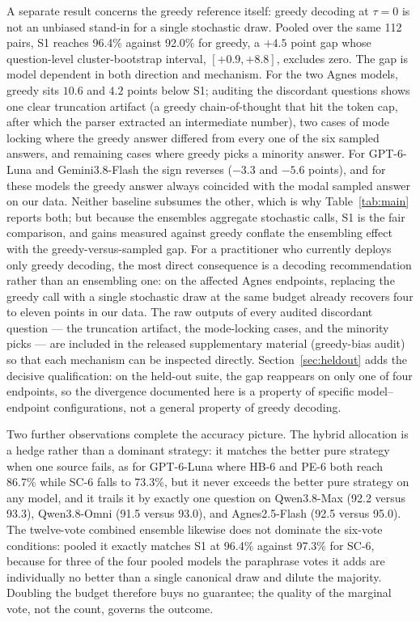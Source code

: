 A separate result concerns the greedy reference itself: greedy decoding at $\tau = 0$ is not an unbiased stand-in for a single stochastic draw. Pooled over the same 112 pairs, S1 reaches 96.4\% against 92.0\% for greedy, a $+4.5$ point gap whose question-level cluster-bootstrap interval, $[+0.9, +8.8]$, excludes zero. The gap is model dependent in both direction and mechanism. For the two Agnes models, greedy sits $10.6$ and $4.2$ points below S1; auditing the discordant questions shows one clear truncation artifact (a greedy chain-of-thought that hit the token cap, after which the parser extracted an intermediate number), two cases of mode locking where the greedy answer differed from every one of the six sampled answers, and remaining cases where greedy picks a minority answer. For GPT-6-Luna and Gemini3.8-Flash the sign reverses ($-3.3$ and $-5.6$ points), and for these models the greedy answer always coincided with the modal sampled answer on our data. Neither baseline subsumes the other, which is why Table~\ref{tab:main} reports both; but because the ensembles aggregate stochastic calls, S1 is the fair comparison, and gains measured against greedy conflate the ensembling effect with the greedy-versus-sampled gap. For a practitioner who currently deploys only greedy decoding, the most direct consequence is a decoding recommendation rather than an ensembling one: on the affected Agnes endpoints, replacing the greedy call with a single stochastic draw at the same budget already recovers four to eleven points in our data. The raw outputs of every audited discordant question --- the truncation artifact, the mode-locking cases, and the minority picks --- are included in the released supplementary material (greedy-bias audit) so that each mechanism can be inspected directly. Section~\ref{sec:heldout} adds the decisive qualification: on the held-out suite, the gap reappears on only one of four endpoints, so the divergence documented here is a property of specific model--endpoint configurations, not a general property of greedy decoding.

Two further observations complete the accuracy picture. The hybrid allocation is a hedge rather than a dominant strategy: it matches the better pure strategy when one source fails, as for GPT-6-Luna where HB-6 and PE-6 both reach 86.7\% while SC-6 falls to 73.3\%, but it never exceeds the better pure strategy on any model, and it trails it by exactly one question on Qwen3.8-Max (92.2 versus 93.3), Qwen3.8-Omni (91.5 versus 93.0), and Agnes2.5-Flash (92.5 versus 95.0). The twelve-vote combined ensemble likewise does not dominate the six-vote conditions: pooled it exactly matches S1 at 96.4\% against 97.3\% for SC-6, because for three of the four pooled models the paraphrase votes it adds are individually no better than a single canonical draw and dilute the majority. Doubling the budget therefore buys no guarantee; the quality of the marginal vote, not the count, governs the outcome.

